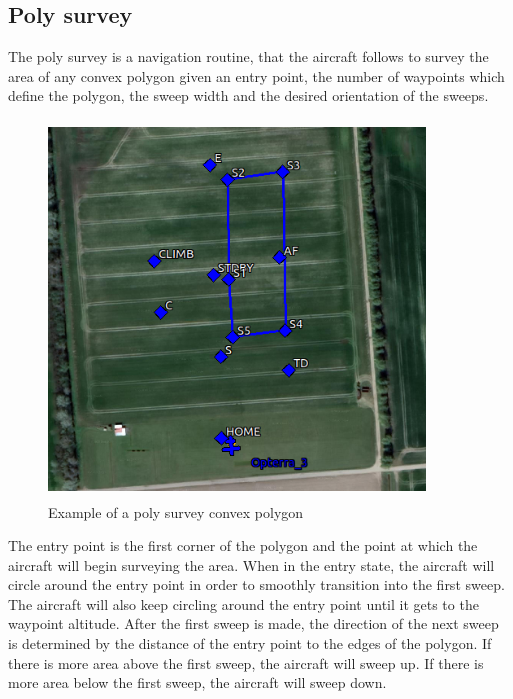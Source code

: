\subsection{Poly survey}
The poly survey is a navigation routine, that the aircraft follows to survey the area of any convex polygon given an entry point, the number of waypoints which define the polygon, the sweep width and the desired orientation of the sweeps.
\begin{figure}[H]
\centering
\includegraphics[width=10cm,height=10cm,keepaspectratio]{imagenes/Convex_polygon.png}
\caption{Example of a poly survey convex polygon}
\label{fig:Convex_poly}
\end{figure}
The entry point is the first corner of the polygon and the point at which the aircraft will begin surveying the area. When in the entry state, the aircraft will circle around the entry point in order to smoothly transition into the first sweep. The aircraft will also keep circling around the entry point until it gets to the waypoint altitude. After the first sweep is made, the direction of the next sweep is determined by the distance of the entry point to the edges of the polygon. If there is more area above the first sweep, the aircraft will sweep up. If there is more area below the first sweep, the aircraft will sweep down.\cite{Poly_survey}

